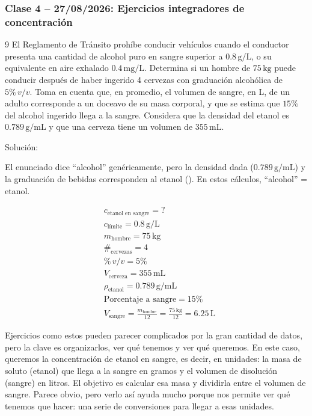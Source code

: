 {}
\subsubsection*{\textcolor{blueunam}{Clase 4 -- 27/08/2026: Ejercicios integradores de concentración}}

\begin{exercise}{9}{}
El Reglamento de Tránsito prohíbe conducir vehículos cuando el conductor 
presenta una cantidad de alcohol puro en sangre superior a $0.8\,\mathrm{g/L}$, 
o su equivalente en aire exhalado $0.4\,\mathrm{mg/L}$. Determina si un hombre 
de $75\,\mathrm{kg}$ puede conducir después de haber ingerido 4 cervezas con 
graduación alcohólica de $5\%\,v/v$. Toma en cuenta que, en promedio, el volumen 
de sangre, en L, de un adulto corresponde a un doceavo de su masa corporal, y 
que se estima que $15\%$ del alcohol ingerido llega a la sangre. Considera que 
la densidad del etanol es $0.789\,\mathrm{g/mL}$ y que una cerveza tiene un 
volumen de $355\,\mathrm{mL}$.

Solución:

\begin{notaimportante}
El enunciado dice ``alcohol'' genéricamente, pero la densidad dada 
($0.789\,\mathrm{g/mL}$) y la graduación de bebidas corresponden al etanol 
(). En estos cálculos, ``alcohol'' = etanol.
\end{notaimportante}

\begin{align*}
    &c_{\text{etanol en sangre}} = ? \\[4pt]
    &c_{\text{límite}} = 0.8\,\mathrm{g/L} \\[4pt]
    &m_{\text{hombre}} = 75\,\mathrm{kg} \\[4pt]
    &\#_{\text{cervezas}} = 4 \\[4pt]
    &\%\,v/v = 5\% \\[4pt]
    &V_{\text{cerveza}} = 355\,\mathrm{mL} \\[4pt]
    &\rho_{\text{etanol}} = 0.789\,\mathrm{g/mL} \\[4pt]
    &\text{Porcentaje a sangre} = 15\% \\[4pt]
    &V_{\text{sangre}} = \frac{m_{\text{hombre}}}{12} 
    = \frac{75\,\mathrm{kg}}{12}
    = 6.25\,\mathrm{L}
\end{align*}

Ejercicios como estos pueden parecer complicados por la gran cantidad de datos, 
pero la clave es organizarlos, ver qué tenemos y ver qué queremos. En este caso, 
queremos la concentración de etanol en sangre, es decir, en unidades: la masa 
de soluto (etanol) que llega a la sangre en gramos y el volumen de disolución 
(sangre) en litros. El objetivo es calcular esa masa y dividirla entre el volumen 
de sangre. Parece obvio, pero verlo así ayuda mucho porque nos permite ver qué 
tenemos que hacer: una serie de conversiones para llegar a esas unidades. \\


\end{exercise}
